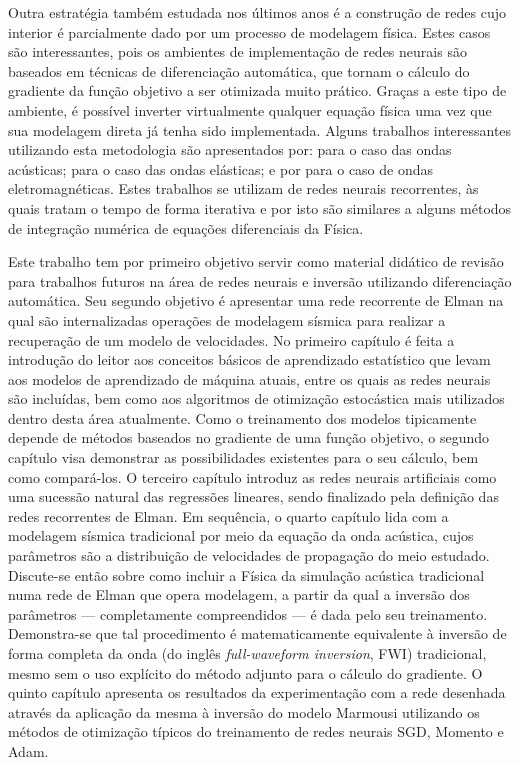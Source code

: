   Outra estratégia também estudada nos últimos anos é a construção de redes cujo interior é parcialmente dado por um processo de modelagem física. Estes casos são interessantes, pois os ambientes de implementação de redes neurais são baseados em técnicas de diferenciação automática, que tornam o cálculo do gradiente da função objetivo a ser otimizada muito prático. Graças a este tipo de ambiente, é possível inverter virtualmente qualquer equação física uma vez que sua modelagem direta já tenha sido implementada. Alguns trabalhos interessantes utilizando esta metodologia são apresentados por:  para o caso das ondas acústicas;  para o caso das ondas elásticas; e por  para o caso de ondas eletromagnéticas. Estes trabalhos se utilizam de redes neurais recorrentes, às quais tratam o tempo de forma iterativa e por isto são similares a alguns métodos de integração numérica de equações diferenciais da Física.

  Este trabalho tem por primeiro objetivo servir como material didático de revisão para trabalhos futuros na área de redes neurais e inversão utilizando diferenciação automática. Seu segundo objetivo é apresentar uma rede recorrente de Elman na qual são internalizadas operações de modelagem sísmica para realizar a recuperação de um modelo de velocidades. No primeiro capítulo é feita a introdução do leitor aos conceitos básicos de aprendizado estatístico que levam aos modelos de aprendizado de máquina atuais, entre os quais as redes neurais são incluídas, bem como aos algoritmos de otimização estocástica mais utilizados dentro desta área atualmente. Como o treinamento dos modelos tipicamente depende de métodos baseados no gradiente de uma função objetivo, o segundo capítulo visa demonstrar as possibilidades existentes para o seu cálculo, bem como compará-los. O terceiro capítulo introduz as redes neurais artificiais como uma sucessão natural das regressões lineares, sendo finalizado pela definição das redes recorrentes de Elman. Em sequência, o quarto capítulo lida com a modelagem sísmica tradicional por meio da equação da onda acústica, cujos parâmetros são a distribuição de velocidades de propagação do meio estudado. Discute-se então sobre como incluir a Física da simulação acústica tradicional numa rede de Elman que opera modelagem, a partir da qual a inversão dos parâmetros --- completamente compreendidos --- é dada pelo seu treinamento. Demonstra-se que tal procedimento é matematicamente equivalente à inversão de forma completa da onda (do inglês \textit{full-waveform inversion}, FWI) tradicional, mesmo sem o uso explícito do método adjunto para o cálculo do gradiente. O quinto capítulo apresenta os resultados da experimentação com a rede desenhada através da aplicação da mesma à inversão do modelo Marmousi  utilizando os métodos de otimização típicos do treinamento de redes neurais SGD, Momento e Adam.
